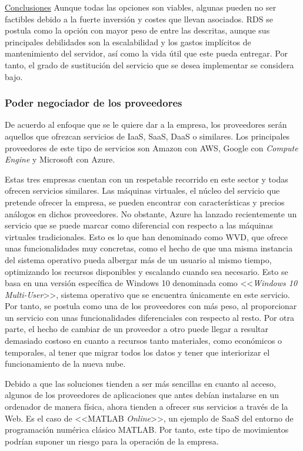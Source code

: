 \noindent\underline{Conclusiones}\newline
\indent Aunque todas las opciones son viables, algunas pueden no ser factibles debido a la fuerte inversión y costes que llevan asociados. \acs{RDS} se postula como la opción con mayor peso de entre las descritas, aunque sus principales debilidades son la escalabilidad y los gastos implícitos de mantenimiento del servidor, así como la vida útil que este pueda entregar. Por tanto, el grado de sustitución del servicio que se desea implementar se considera bajo.

\subsubsection{Poder negociador de los proveedores}
De acuerdo al enfoque que se le quiere dar a la empresa, los proveedores serán aquellos que ofrezcan servicios de \acs{IaaS}, \acs{SaaS}, \acs{DaaS} o similares. Los principales proveedores de este tipo de servicios son Amazon con \acf{AWS}, Google con \textit{Compute Engine} y Microsoft con Azure.

Estas tres empresas cuentan con un respetable recorrido en este sector y todas ofrecen servicios similares. Las máquinas virtuales, el núcleo del servicio que pretende ofrecer la empresa, se pueden encontrar con características y precios análogos en dichos proveedores. No obstante, Azure ha lanzado recientemente un servicio que se puede marcar como diferencial con respecto a las máquinas virtuales tradicionales. Esto es lo que han denominado como \acs{WVD}, que ofrece unas funcionalidades muy concretas, como el hecho de que una misma instancia del sistema operativo pueda albergar más de un usuario al mismo tiempo, optimizando los recursos disponibles y escalando cuando sea necesario. Esto se basa en una versión específica de Windows 10 denominada como <<\textit{Windows 10 Multi-User}>>, sistema operativo que se encuentra únicamente en este servicio. Por tanto, se postula como una de los proveedores con más peso, al proporcionar un servicio con unas funcionalidades diferenciales con respecto al resto. Por otra parte, el hecho de cambiar de un proveedor a otro puede llegar a resultar demasiado costoso en cuanto a recursos tanto materiales, como económicos o temporales, al tener que migrar todos los datos y tener que interiorizar el funcionamiento de la nueva nube.

Debido a que las soluciones tienden a ser más sencillas en cuanto al acceso, algunos de los proveedores de aplicaciones que antes debían instalarse en un ordenador de manera física, ahora tienden a ofrecer sus servicios a través de la Web. Es el caso de <<MATLAB \textit{Online}>>, un ejemplo de \acs{SaaS} del entorno de programación numérica clásico MATLAB. Por tanto, este tipo de movimientos podrían suponer un riesgo para la operación de la empresa.


